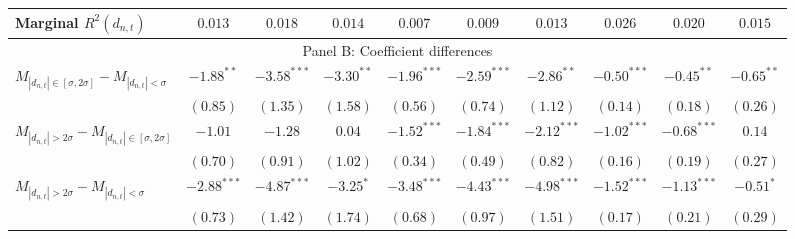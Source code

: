 \begin{tabular}{lccccccccc}
  Marginal $R^2(d_{n,t})$ & $0.013$ & $0.018$ & $0.014$ & $0.007$ & $0.009$ & $0.013$ & $0.026$ & $0.020$ & $0.015$ \\ 
   \hline \multicolumn{10}{c}{Panel B: Coefficient differences} \\
 \hline$M_{|d_{n,t}| \in [\sigma, 2\sigma]} - M_{|d_{n,t}| < \sigma}$ & $-1.88^{**}$ & $-3.58^{***}$ & $-3.30^{**}$ & $-1.96^{***}$ & $-2.59^{***}$ & $-2.86^{**}$ & $-0.50^{***}$ & $-0.45^{**}$ & $-0.65^{**}$ \\ 
   & $(0.85)$ & $(1.35)$ & $(1.58)$ & $(0.56)$ & $(0.74)$ & $(1.12)$ & $(0.14)$ & $(0.18)$ & $(0.26)$ \\ 
  $M_{|d_{n,t}| > 2 \sigma} - M_{|d_{n,t}| \in [\sigma, 2\sigma]}$ & $-1.01$ & $-1.28$ & $0.04$ & $-1.52^{***}$ & $-1.84^{***}$ & $-2.12^{***}$ & $-1.02^{***}$ & $-0.68^{***}$ & $0.14$ \\ 
   & $(0.70)$ & $(0.91)$ & $(1.02)$ & $(0.34)$ & $(0.49)$ & $(0.82)$ & $(0.16)$ & $(0.19)$ & $(0.27)$ \\ 
  $M_{|d_{n,t}| > 2 \sigma} - M_{|d_{n,t}| < \sigma}$ & $-2.88^{***}$ & $-4.87^{***}$ & $-3.25^{*}$ & $-3.48^{***}$ & $-4.43^{***}$ & $-4.98^{***}$ & $-1.52^{***}$ & $-1.13^{***}$ & $-0.51^{*}$ \\ 
   & $(0.73)$ & $(1.42)$ & $(1.74)$ & $(0.68)$ & $(0.97)$ & $(1.51)$ & $(0.17)$ & $(0.21)$ & $(0.29)$ \\ 
   \hline 
\end{tabular}
